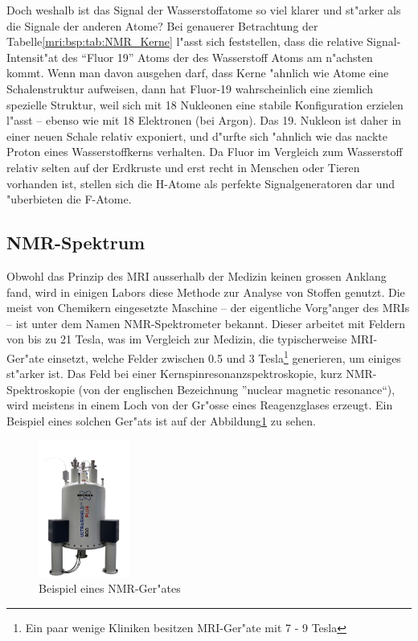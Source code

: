 Doch weshalb ist das Signal der Wasserstoffatome so viel klarer und st"arker als die Signale der anderen Atome? Bei genauerer Betrachtung der Tabelle\;\ref{mri:bsp:tab:NMR_Kerne} l"asst sich feststellen, dass die relative Signal-Intensit"at des "`Fluor 19"' Atoms der des Wasserstoff Atoms am n"achsten kommt. Wenn man davon ausgehen darf, dass Kerne "ahnlich wie Atome eine Schalenstruktur aufweisen, dann hat Fluor-19 wahrscheinlich eine ziemlich spezielle Struktur, weil sich mit 18 Nukleonen eine stabile Konfiguration erzielen l"asst -- ebenso wie mit 18 Elektronen (bei Argon). Das 19. Nukleon ist daher in einer neuen Schale relativ exponiert, und d"urfte sich "ahnlich wie das nackte Proton eines Wasserstoffkerns verhalten. Da Fluor im Vergleich zum Wasserstoff relativ selten auf der Erdkruste und erst recht in Menschen oder Tieren vorhanden ist, stellen sich die H-Atome als perfekte Signalgeneratoren dar und "uberbieten die F-Atome. 

\subsection{NMR-Spektrum}
Obwohl das Prinzip des MRI ausserhalb der Medizin keinen grossen Anklang fand, wird in einigen Labors diese Methode zur Analyse von Stoffen genutzt. Die meist von Chemikern eingesetzte Maschine -- der eigentliche Vorg"anger des MRIs -- ist unter dem Namen NMR-Spektrometer bekannt. Dieser arbeitet mit Feldern von bis zu 21 Tesla, was im Vergleich zur Medizin, die typischerweise MRI-Ger"ate einsetzt, welche Felder zwischen 0.5 und 3 Tesla\footnote{Ein paar wenige Kliniken besitzen MRI-Ger"ate mit 7 - 9 Tesla} generieren, um einiges st"arker ist. Das Feld bei einer Kernspinresonanzspektroskopie, kurz NMR-Spektroskopie (von der englischen Bezeichnung ”nuclear magnetic resonance“), wird meistens in einem Loch von der Gr"osse eines Reagenzglases erzeugt. Ein Beispiel eines solchen Ger"ats ist auf der Abbildung\;\ref{mri:bsp:abb:nmr_Beispiel} zu sehen. 
\begin{figure}
	\centering
	\includegraphics[width = 3cm]{./mri/pic/NMR.png}
	\caption{Beispiel eines NMR-Ger"ates \cite{skript:mri:MaxPlanckCampus}}
	\label{mri:bsp:abb:nmr_Beispiel}
\end{figure}

